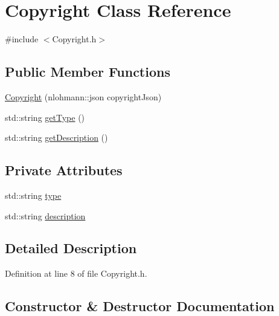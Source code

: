 \hypertarget{class_copyright}{}\section{Copyright Class Reference}
\label{class_copyright}


{\ttfamily \#include $<$Copyright.\+h$>$}

\subsection*{Public Member Functions}
\begin{DoxyCompactItemize}
\item 
\mbox{\hyperlink{class_copyright_a3aa60832dc0603d965d4364662322770}{Copyright}} (nlohmann\+::json copyright\+Json)
\item 
std\+::string \mbox{\hyperlink{class_copyright_a2ba8fa195b324e5193f31236f2c33d40}{get\+Type}} ()
\item 
std\+::string \mbox{\hyperlink{class_copyright_a095515cc84989cd76736037a9b3b1e3c}{get\+Description}} ()
\end{DoxyCompactItemize}
\subsection*{Private Attributes}
\begin{DoxyCompactItemize}
\item 
std\+::string \mbox{\hyperlink{class_copyright_a7ff74e20aebd2c5987bafa31281609fa}{type}}
\item 
std\+::string \mbox{\hyperlink{class_copyright_a80d81f20307c55080670a07ccdd0ead1}{description}}
\end{DoxyCompactItemize}


\subsection{Detailed Description}


Definition at line 8 of file Copyright.\+h.



\subsection{Constructor \& Destructor Documentation}
\mbox{\label{class_copyright_a3aa60832dc0603d965d4364662322770}} 
